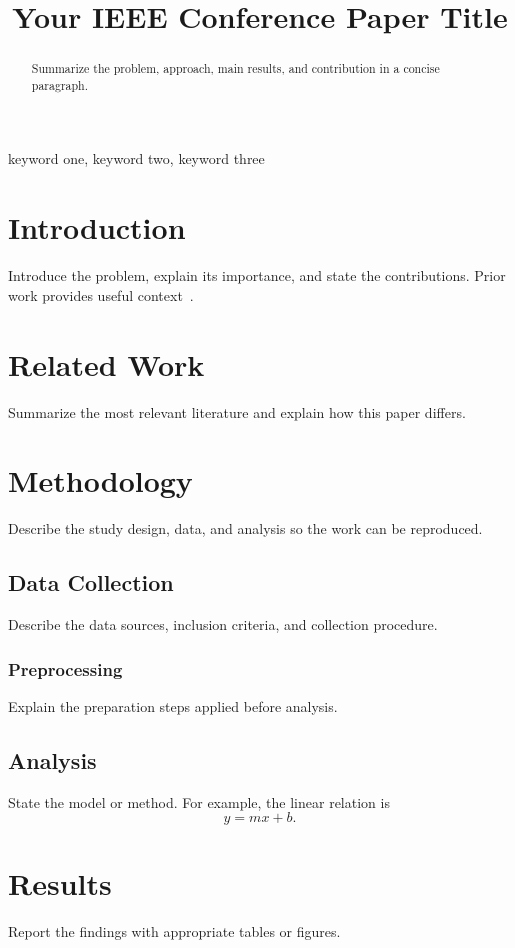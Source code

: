 \documentclass[conference]{IEEEtran}
\title{Your IEEE Conference Paper Title}
\author{\IEEEauthorblockN{First Author}
\IEEEauthorblockA{Department, University\\
City, Country\\
author@example.com}}
\begin{document}
\maketitle
\begin{abstract}
Summarize the problem, approach, main results, and contribution in a concise paragraph.
\end{abstract}
\begin{IEEEkeywords}
keyword one, keyword two, keyword three
\end{IEEEkeywords}
\section{Introduction}\label{sec:introduction}
Introduce the problem, explain its importance, and state the contributions. Prior work provides useful context~\cite{einstein1905}.
\section{Related Work}\label{sec:related-work}
Summarize the most relevant literature and explain how this paper differs.
\section{Methodology}\label{sec:methodology}
Describe the study design, data, and analysis so the work can be reproduced.
\subsection{Data Collection}\label{subsec:data}
Describe the data sources, inclusion criteria, and collection procedure.
\subsubsection{Preprocessing}
Explain the preparation steps applied before analysis.
\subsection{Analysis}\label{subsec:analysis}
State the model or method. For example, the linear relation is
\begin{equation}
  y = mx + b.
\end{equation}
\section{Results}\label{sec:results}
Report the findings with appropriate tables or figures.
\end{document}
